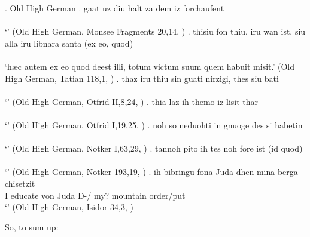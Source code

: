 \ex. Old High German
\ag. gaat uz diu halt za dem iz forchaufent\\
 \\
 `' \hfill (Old High German, Monsee Fragments 20,14, \citealt[761]{behaghel1923})
\bg. thisiu fon thiu, iru wan ist, siu alla iru libnara santa (ex eo, quod)\\
 \\
 `hæc autem ex eo quod deest illi, totum victum suum quem habuit misit.' \hfill (Old High German, Tatian 118,1, \citealt[761]{behaghel1923})
\bg. thaz iru thiu sin guati nirzigi, thes siu bati\\
 \\
 `' \hfill (Old High German, Otfrid II,8,24, \citealt[761]{behaghel1923})
\bg. thia laz ih themo iz lisit thar\\
 \\
 `' \hfill (Old High German, Otfrid I,19,25, \citealt[761]{behaghel1923})
\bg. noh so neduohti in gnuoge des si habetin\\
 \\
 `' \hfill (Old High German, Notker I,63,29, \citealt[761]{behaghel1923})
\bg. tannoh pito ih tes noh fore ist (id quod)\\
 \\
 `' \hfill (Old High German, Notker 193,19, \citealt[761]{behaghel1923})
\bg. ih bibringu fona Juda dhen mina berga chisetzit\\
  I educate von Juda D-/ my? mountain order/put\\
  `' \hfill (Old High German, Isidor 34,3, \citealt[761]{behaghel1923})

So, to sum up:




